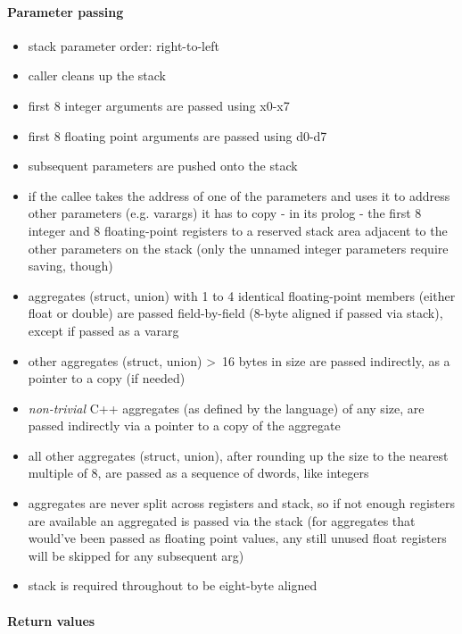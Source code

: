 \paragraph{Parameter passing}

\begin{itemize}
\item stack parameter order: right-to-left
\item caller cleans up the stack
\item first 8 integer arguments are passed using x0-x7
\item first 8 floating point arguments are passed using d0-d7
\item subsequent parameters are pushed onto the stack
\item if the callee takes the address of one of the parameters and uses it to address other parameters (e.g. varargs) it has to copy - in its prolog - the first 8 integer
and 8 floating-point registers to a reserved stack area adjacent to the other parameters on the stack (only the unnamed integer parameters require saving, though)
\item aggregates (struct, union) with 1 to 4 identical floating-point members (either float or double) are passed field-by-field (8-byte aligned if passed via stack), except if passed as a vararg
\item other aggregates (struct, union) \textgreater\ 16 bytes in size are passed indirectly, as a pointer to a copy (if needed)
\item {\it non-trivial} C++ aggregates (as defined by the language) of any size, are passed indirectly via a pointer to a copy of the aggregate
\item all other aggregates (struct, union), after rounding up the size to the nearest multiple of 8, are passed as a sequence of dwords, like integers
\item aggregates are never split across registers and stack, so if not enough registers are available an aggregated is passed via the stack (for aggregates that
would've been passed as floating point values, any still unused float registers will be skipped for any subsequent arg)
\item stack is required throughout to be eight-byte aligned
\end{itemize}

\paragraph{Return values}

